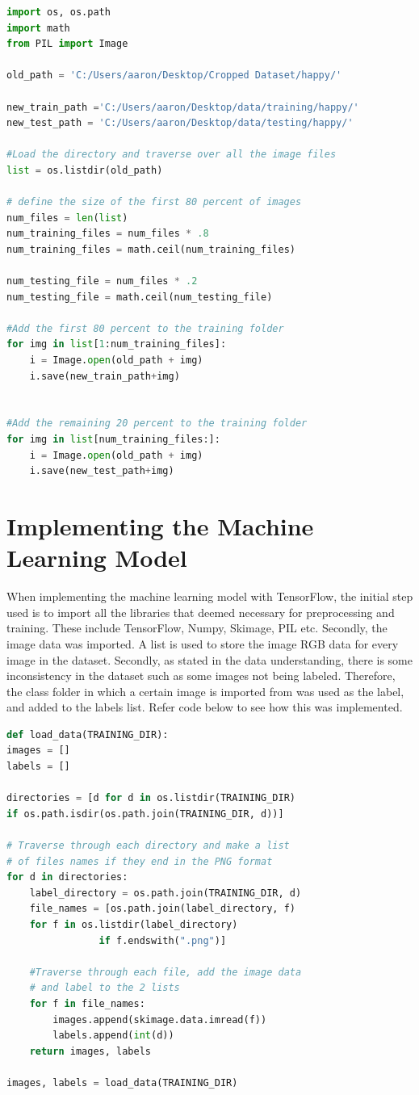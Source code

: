 \begin{lstlisting}[language=Python, frame=single]
import os, os.path
import math
from PIL import Image

old_path = 'C:/Users/aaron/Desktop/Cropped Dataset/happy/'

new_train_path ='C:/Users/aaron/Desktop/data/training/happy/'
new_test_path = 'C:/Users/aaron/Desktop/data/testing/happy/'

#Load the directory and traverse over all the image files
list = os.listdir(old_path)

# define the size of the first 80 percent of images
num_files = len(list)
num_training_files = num_files * .8
num_training_files = math.ceil(num_training_files)

num_testing_file = num_files * .2
num_testing_file = math.ceil(num_testing_file)

#Add the first 80 percent to the training folder
for img in list[1:num_training_files]: 
	i = Image.open(old_path + img)
	i.save(new_train_path+img)


#Add the remaining 20 percent to the training folder
for img in list[num_training_files:]:
	i = Image.open(old_path + img)
	i.save(new_test_path+img)
\end{lstlisting}

\section{Implementing the Machine Learning Model}

When implementing the machine learning model with TensorFlow, the initial step used is to import all the libraries that deemed necessary for preprocessing and training. These include TensorFlow, Numpy, Skimage, PIL etc. Secondly, the image data was imported. A list is used to store the image RGB data for every image in the dataset. Secondly, as stated in the data understanding, there is some inconsistency in the dataset such as some images not being labeled. Therefore, the class folder in which a certain image is imported from was used as the label, and added to the labels list. Refer code below to see how this was implemented.

\begin{lstlisting}[language=Python, frame=single]
def load_data(TRAINING_DIR):
images = []
labels = []

directories = [d for d in os.listdir(TRAINING_DIR) 
if os.path.isdir(os.path.join(TRAINING_DIR, d))]

# Traverse through each directory and make a list
# of files names if they end in the PNG format
for d in directories:
	label_directory = os.path.join(TRAINING_DIR, d)
	file_names = [os.path.join(label_directory, f) 
	for f in os.listdir(label_directory) 
				if f.endswith(".png")]
	
	#Traverse through each file, add the image data
	# and label to the 2 lists
	for f in file_names:
		images.append(skimage.data.imread(f))
		labels.append(int(d))
	return images, labels

images, labels = load_data(TRAINING_DIR)
\end{lstlisting}

